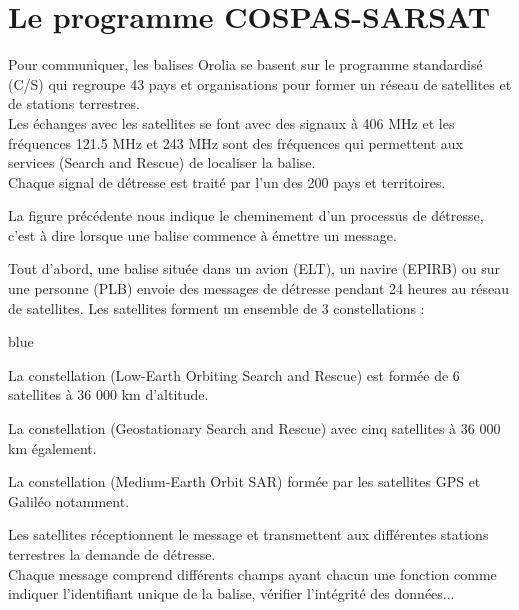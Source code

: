 \section{Le programme COSPAS-SARSAT}

Pour communiquer, les balises Orolia se basent sur le programme standardisé  (C/S)  qui regroupe 43 pays et organisations pour former un réseau de satellites et de stations terrestres. \\ Les échanges avec les satellites se font avec des signaux à 406 MHz et les fréquences 121.5 MHz et 243 MHz sont des fréquences qui permettent aux services 
(Search and Rescue) de localiser la balise.\\

Chaque signal de détresse est traité par l'un des 200 pays et territoires.



La figure précédente nous indique le cheminement d'un processus de détresse, c'est à dire lorsque une balise commence à émettre un message.

Tout d'abord, une balise située dans un avion (ELT), un navire (EPIRB) ou sur une personne (PLB) envoie des messages de détresse pendant 24 heures au réseau de satellites. 
Les satellites forment un ensemble de 3 constellations : 


\begin{items}{blue}{\Circle}
    \item La constellation  (Low-Earth Orbiting Search and Rescue) est formée de 6 satellites à 36 000 km d'altitude.
    \item La constellation  (Geostationary Search and Rescue) avec cinq satellites à 36 000 km également.
    \item La constellation  (Medium-Earth Orbit SAR) formée par les satellites GPS et Galiléo notamment.
\end{items}

Les satellites réceptionnent le message et transmettent aux différentes stations terrestres la demande de détresse.\\

Chaque message comprend différents champs ayant chacun une fonction comme indiquer l'identifiant unique de la balise, vérifier l'intégrité des données...\\

